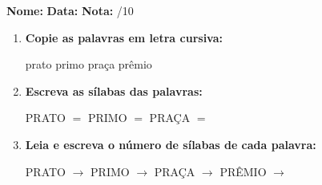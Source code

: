 \begin{exercicio}



\noindent\textbf{Nome:} \underline{\hspace{3.2cm}} \quad \textbf{Data:} \underline{\hspace{1.6cm}} \quad \textbf{Nota:} \underline{\hspace{0.9cm}}/10


\begin{enumerate}

  \item \textbf{Copie as palavras em letra cursiva:}
  \begin{center}
  prato \quad primo \quad praça \quad prêmio
  \end{center}
  \begin{center}
  \underline{\hspace{2.4cm}} \quad \underline{\hspace{2.4cm}} \quad \underline{\hspace{2.4cm}} \quad \underline{\hspace{2.4cm}}
  \end{center}

  \item \textbf{Escreva as sílabas das palavras:}
  \begin{center}
  PRATO $=$ \underline{\hspace{1.5cm}} \underline{\hspace{1.5cm}} \quad PRIMO $=$ \underline{\hspace{1.5cm}} \underline{\hspace{1.5cm}} \quad PRAÇA $=$ \underline{\hspace{1.5cm}} \underline{\hspace{1.5cm}}
  \end{center}

  \item \textbf{Leia e escreva o número de sílabas de cada palavra:}
  \begin{center}
  PRATO $\rightarrow$ \underline{\hspace{0.9cm}} \quad PRIMO $\rightarrow$ \underline{\hspace{0.9cm}} \quad PRAÇA $\rightarrow$ \underline{\hspace{0.9cm}} \quad PRÊMIO $\rightarrow$ \underline{\hspace{0.9cm}}
  \end{center}


\end{enumerate}
\end{exercicio}
